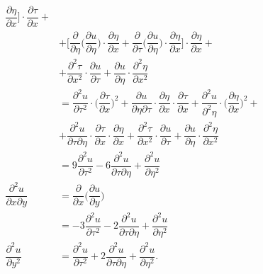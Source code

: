\begin{align*}
                                       \dfrac{\partial \eta}{\partial x} \Big] \cdot \dfrac{\partial \tau}{\partial x} + \\
                                       &+ \Big[ \dfrac{\partial}{\partial \eta} \Big(\dfrac{\partial u}{\partial \eta}\Big) \cdot %
                                           \dfrac{\partial \eta}{\partial x} + \dfrac{\partial}{\partial \tau} \Big(\dfrac{\partial u}{\partial \eta}\Big) \cdot %
                                       \dfrac{\partial \eta}{\partial x} \Big] \cdot \dfrac{\partial \eta}{\partial x} + \\
                                       &+ \dfrac{\partial^2 \tau}{\partial x^2} \cdot \dfrac{\partial u}{\partial \tau} + %
                                       \dfrac{\partial u}{\partial \eta} \cdot \dfrac{\partial^2 \eta}{\partial x^2} \\
                                       &= \dfrac{\partial^2 u}{\partial \tau^2} \cdot \Big( \dfrac{\partial \tau}{\partial x} \Big)^2 + %
                                       \dfrac{\partial u}{\partial \eta \partial \tau} \cdot \dfrac{\partial \eta}{\partial x} \cdot \dfrac{\partial \tau}{\partial x} + %
                                       \dfrac{\partial^2 u}{\partial^2 \eta} \cdot \Big( \dfrac{\partial \eta}{\partial x} \Big)^2 + \\
                                       &+ \dfrac{\partial^2 u}{\partial \tau\partial \eta} \cdot \dfrac{\partial \tau}{\partial x} \cdot \dfrac{\partial \eta}{\partial x} + %
                                       \dfrac{\partial^2 \tau}{\partial x^2} \cdot \dfrac{\partial u}{\partial \tau} + \dfrac{\partial u}{\partial \eta} \cdot %
                                       \dfrac{\partial^2 \eta}{\partial x^2} \\
                                       &= 9 \dfrac{\partial^2 u}{\partial \tau^2} - %
                                       6 \dfrac{\partial^2 u}{\partial \tau \partial \eta} + %
                                       \dfrac{\partial^2 u}{\partial \eta^2} \\
    \dfrac{\partial^2 u}{\partial x \partial y} &= \dfrac{\partial}{\partial x}\Big( \dfrac{\partial u}{\partial y} \Big)\\
                                                &= -3\dfrac{\partial^2 u}{\partial \tau^2} - %
                                                2 \dfrac{\partial ^2 u}{\partial \tau \partial \eta} + %
                                                \dfrac{\partial^2 u}{\partial \eta^2} \\
    \dfrac{\partial^2 u}{\partial y^2} &= \dfrac{\partial^2 u}{\partial \tau^2} + %
    2 \dfrac{\partial^2 u}{\partial \tau \partial \eta} + %
    \dfrac{\partial^2 u}{\partial \eta^2}.  
\end{align*}

